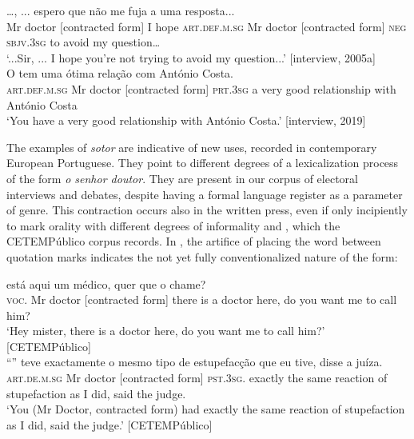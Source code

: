 \documentclass[output=paper]{langscibook}
\begin{document}
\ea\label{ex:marques:34}
\gll …, ... {espero que}                                        não     {me fuja a uma resposta...}\\
         Mr {doctor [contracted form]}  {I hope}    \textsc{art.def.m.sg} {Mr doctor [contracted form]} \textsc{neg}   {\textsc{sbjv.3sg} to avoid my question…}\\
\glt ‘...Sir, ... I hope you’re not trying to avoid my question...’ [interview, 2005a]\\
\ex\label{ex:marques:35}
\gll O                                tem      uma ótima relação {com António Costa.}\\
         \textsc{art.def.m.sg}  {Mr doctor [contracted form]}  \textsc{prt.3sg}  a very good {relationship with António Costa}\\
\glt ‘You have a very good relationship with António Costa.’ [interview, 2019]
\z 


The examples of \textit{sotor} are indicative of new uses, recorded in contemporary European Portuguese. They point to different degrees of a lexicalization process of the form \textit{o senhor doutor}. They are present in our corpus of electoral interviews and debates, despite having a formal language register as a parameter of genre. This contraction occurs also in the written press, even if only incipiently to mark orality with different degrees of informality  and , which the CETEMPúblico corpus records. In , the artifice of placing the word between quotation marks indicates the not yet fully conventionalized nature of the form:\largerpage[-2]

\ea\label{ex:marques:36}
\gll {}                        {está aqui um médico, quer que o} chame?\\
         \textsc{voc.}  {Mr doctor [contracted form]}  {there is a doctor here, do you want} {me to call him?}\\
\glt ‘Hey mister, there is a doctor here, do you want me to call him?’ [CETEMPúblico]\\
\ex\label{ex:marques:37}
\gll {}            “”                  teve      exactamente o mesmo tipo de estupefacção que eu tive, disse a juíza.\\
         \textsc{art.de.m.sg}  {Mr doctor [contracted form]}  \textsc{pst.3sg.}  exactly the same reaction of stupefaction as I did, said the judge.\\
\glt ‘You (Mr Doctor, contracted form) had exactly the same reaction of stupefaction as I did, said the judge.’ [CETEMPúblico]
\z 
\end{document}
